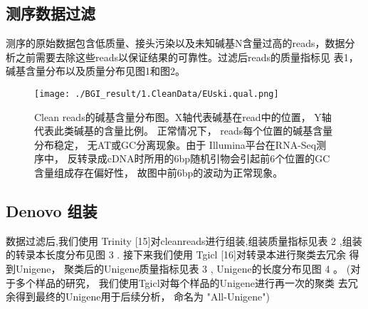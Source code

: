 \documentclass[10pt,oneside,a4paper]{article}	%
\begin{document}
\subsection{测序数据过滤}
测序的原始数据包含低质量、接头污染以及未知碱基N含量过高的reads，数据分析之前需要去除这些reads以保证结果的可靠性。过滤后reads的质量指标见
表1，碱基含量分布以及质量分布见图1和图2。\par
\vspace{5 mm}
\begin{table}[H]
\centering
{}
\end{table}

\begin{figure}[H]
\centering
\texttt{[image: ./BGI\_result/1.CleanData/EUski.qual.png]}	%
\par
\caption{Clean reads的碱基含量分布图。X轴代表碱基在read中的位置， Y轴代表此类碱基的含量比例。 正常情况下， reads每个位置的碱基含量分布稳定， 无AT或GC分离现象。由于
Illumina平台在RNA-Seq测序中， 反转录成cDNA时所用的6bp随机引物会引起前6个位置的GC含量组成存在偏好性， 故图中前6bp的波动为正常现象。}
\label{ReadsHeatmap}
\end{figure}
\vspace{5 mm}

\subsection{Denovo 组装}
数据过滤后,我们使用 Trinity [15]对cleanreads进行组装,组装质量指标见表 2 ,组装的转录本长度分布见图 3 . 接下来我们使用 Tgicl [16]对转录本进行聚类去冗余
得到Unigene， 聚类后的Unigene质量指标见表 3 , Unigene的长度分布见图 4 。 (对于多个样品的研究， 我们使用Tgicl对每个样品的Unigene进行再一次的聚类
去冗余得到最终的Unigene用于后续分析， 命名为 "All-Unigene")\par
\end{document}
